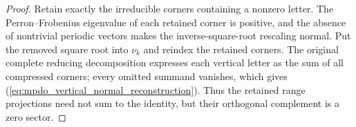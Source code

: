 \begin{proof}
    \leanok
    Retain exactly the irreducible corners containing a nonzero letter. The
    Perron--Frobenius eigenvalue of each retained corner is positive, and the
    absence of nontrivial periodic vectors makes the inverse-square-root
    rescaling normal. Put the removed square root into $\nu_k$ and reindex the
    retained corners. The original complete reducing decomposition expresses
    each vertical letter as the sum of all compressed corners; every omitted
    summand vanishes, which gives
    (\ref{eq:mpdo_vertical_normal_reconstruction}). Thus the retained range
    projections need not sum to the identity, but their orthogonal complement
    is a zero sector.
\end{proof}

